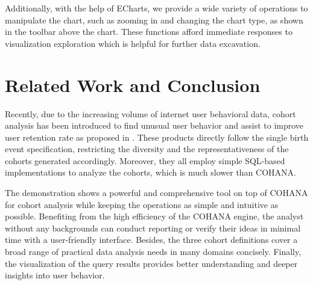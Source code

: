 Additionally, with the help of ECharts\cite{echarts}, we provide a wide variety of operations to manipulate the chart, such as zooming in and changing the chart type, as shown in the toolbar above the chart. These functions afford immediate responses to visualization exploration which is helpful for further data excavation.

\section{Related Work and Conclusion}

Recently, due to the increasing volume of internet user behavioral data, cohort
analysis has been introduced to find unusual user behavior and assist to
improve user retention rate as proposed in \cite{amplitude, mixpanel, rjmetrics}. These
products directly follow the single birth event specification, restricting the diversity and the representativeness of the cohorts generated accordingly.
Moreover, they all employ simple SQL-based implementations to analyze the cohorts, which is much slower than COHANA.

The demonstration shows a powerful and comprehensive tool on top of COHANA for cohort analysis while keeping the operations as simple and intuitive as possible. Benefiting from the high efficiency of the COHANA engine, the analyst without any backgrounds can conduct reporting or verify their ideas in minimal time with a user-friendly interface. Besides, the three cohort definitions cover a broad range of practical data analysis needs in many domains concisely. Finally, the visualization of the query results provides better understanding and deeper insights into user behavior.